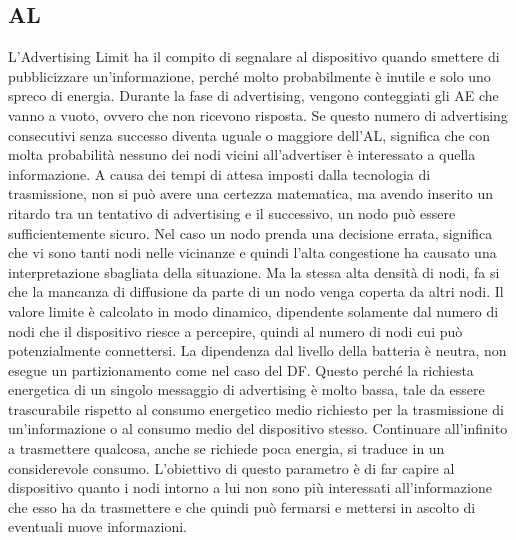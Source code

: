 \subsection{\acf{AL}}
L'Advertising Limit ha il compito di segnalare al dispositivo quando smettere di pubblicizzare un'informazione, perché molto probabilmente è inutile e solo uno spreco di energia.  Durante la fase di advertising, vengono conteggiati gli \acf{AE} che vanno a vuoto, ovvero che non ricevono risposta. Se questo numero di advertising consecutivi senza successo diventa uguale o maggiore dell'AL, significa che con molta probabilità nessuno dei nodi vicini all'advertiser è interessato a quella informazione. A causa dei tempi di attesa imposti dalla tecnologia di trasmissione, non si può avere una certezza matematica, ma avendo inserito un ritardo tra un tentativo di advertising e il successivo, un nodo può essere sufficientemente sicuro. Nel caso un nodo prenda una decisione errata, significa che vi sono tanti nodi nelle vicinanze e quindi l'alta congestione ha causato una interpretazione sbagliata della situazione. Ma la stessa alta densità di nodi, fa si che la mancanza di diffusione da parte di un nodo venga coperta da altri nodi. Il valore limite è calcolato in modo dinamico, dipendente solamente dal numero di nodi che il dispositivo riesce a percepire, quindi al numero di nodi cui può potenzialmente connettersi. La dipendenza dal livello della batteria è neutra, non esegue un partizionamento come nel caso del DF. Questo perché la richiesta energetica di un singolo messaggio di advertising è molto bassa, tale da essere trascurabile rispetto al consumo energetico medio richiesto per la trasmissione di un'informazione o al consumo medio del dispositivo stesso. Continuare all'infinito a trasmettere qualcosa, anche se richiede poca energia, si traduce in un considerevole consumo. L'obiettivo di questo parametro è di far capire al dispositivo quanto i nodi intorno a lui non sono più interessati all'informazione che esso ha da trasmettere e che quindi può fermarsi e mettersi in ascolto di eventuali nuove informazioni.

